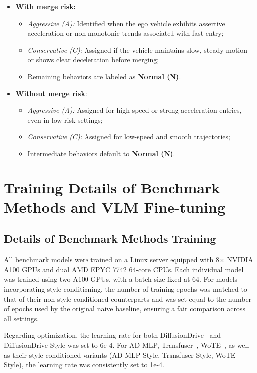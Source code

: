 \documentclass{article}
\begin{document}
\begin{itemize}[leftmargin=1em, topsep=0pt, itemsep=0.3em]
    \item \textbf{With merge risk:}
    \begin{itemize}
        \item \textit{Aggressive (A):} Identified when the ego vehicle exhibits assertive acceleration or non-monotonic trends associated with fast entry;
        \item \textit{Conservative (C):} Assigned if the vehicle maintains slow, steady motion or shows clear deceleration before merging;
        \item Remaining behaviors are labeled as \textbf{Normal (N)}.
    \end{itemize}

    \item \textbf{Without merge risk:}
    \begin{itemize}
        \item \textit{Aggressive (A):} Assigned for high-speed or strong-acceleration entries, even in low-risk settings;
        \item \textit{Conservative (C):} Assigned for low-speed and smooth trajectories;
        \item Intermediate behaviors default to \textbf{Normal (N)}.
    \end{itemize}
\end{itemize}



\section{Training Details of Benchmark Methods and VLM Fine-tuning}\label{sec: vlm}

\subsection{Details of Benchmark Methods Training}
All benchmark models were trained on a Linux server equipped with 8× NVIDIA A100 GPUs and dual AMD EPYC 7742 64-core CPUs. Each individual model was trained using two A100 GPUs, with a batch size fixed at 64. For models incorporating style-conditioning, the number of training epochs was matched to that of their non-style-conditioned counterparts and was set equal to the number of epochs used by the original naive baseline, ensuring a fair comparison across all settings.

Regarding optimization, the learning rate for both DiffusionDrive~\cite{liao2024diffusiondrive} and DiffusionDrive-Style was set to 6e-4. For AD-MLP\cite{zhai2023rethinking}, Transfuser~\cite{chitta2022transfuser}, WoTE~\cite{li2025end}, as well as their style-conditioned variants (AD-MLP-Style, Transfuser-Style, WoTE-Style), the learning rate was consistently set to 1e-4.
\end{document}
